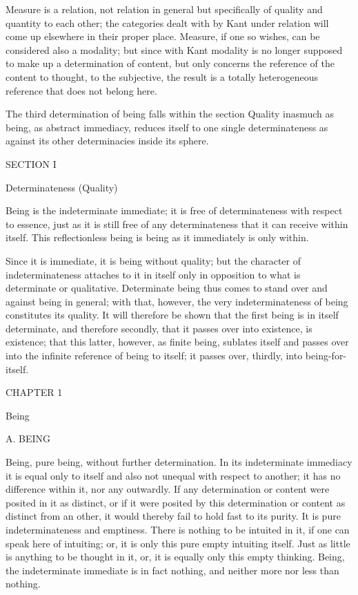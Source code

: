Measure is a relation, not relation in general
but specifically of quality and quantity to each other;
the categories dealt with by Kant under relation
will come up elsewhere in their proper place.
Measure, if one so wishes, can be considered also a modality;
but since with Kant modality is no longer
supposed to make up a determination of content,
but only concerns the reference of the content
to thought, to the subjective,
the result is a totally heterogeneous reference
that does not belong here.

The third determination of being falls within
the section Quality inasmuch as being, as abstract immediacy,
reduces itself to one single determinateness
as against its other determinacies inside its sphere.

SECTION I

Determinateness (Quality)

Being is the indeterminate immediate;
it is free of determinateness with respect to essence,
just as it is still free of any determinateness
that it can receive within itself.
This reflectionless being is being
as it immediately is only within.

Since it is immediate, it is being without quality;
but the character of indeterminateness attaches to it in itself
only in opposition to what is determinate or qualitative.
Determinate being thus comes to stand over and against being in general;
with that, however, the very indeterminateness of being
constitutes its quality.
It will therefore be shown that the first being is
in itself determinate, and therefore secondly,
that it passes over into existence, is existence;
that this latter, however, as finite being, sublates itself
and passes over into the infinite reference of being to itself;
it passes over, thirdly, into being-for-itself.

CHAPTER 1

Being

A. BEING

Being, pure being, without further determination.
In its indeterminate immediacy it is equal only to itself
and also not unequal with respect to another;
it has no difference within it, nor any outwardly.
If any determination or content were posited in it as distinct,
or if it were posited by this determination or content
as distinct from an other,
it would thereby fail to hold fast to its purity.
It is pure indeterminateness and emptiness.
There is nothing to be intuited in it,
if one can speak here of intuiting;
or, it is only this pure empty intuiting itself.
Just as little is anything to be thought in it,
or, it is equally only this empty thinking.
Being, the indeterminate immediate is in fact nothing,
and neither more nor less than nothing.

